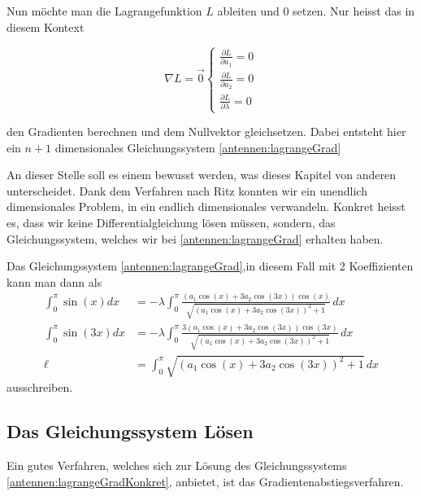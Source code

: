 Nun möchte man die Lagrangefunktion $L$ ableiten und 0 setzen. Nur heisst das in
diesem Kontext

\begin{equation}
	\nabla L = \vec{0} 
	\left\{ 
	\begin{aligned}
		\frac{\partial L}{\partial a_1} = 0 \\
		\frac{\partial L}{\partial a_2} = 0 \\
		\frac{\partial L}{\partial \lambda} = 0
	\end{aligned}
	\right.
	\label{antennen:lagrangeGrad}
\end{equation}

den Gradienten berechnen und dem Nullvektor gleichsetzen. Dabei entsteht hier ein 
$n+1$ dimensionales Gleichungssystem \eqref{antennen:lagrangeGrad}

An dieser Stelle soll es einem bewusst werden, was dieses Kapitel von anderen 
unterscheidet. Dank dem Verfahren nach Ritz konnten wir ein unendlich dimensionales
Problem, in ein endlich dimensionales verwandeln. 
Konkret heisst es, dass wir keine Differentialgleichung lösen müssen, sondern, 
das Gleichungssystem, welches wir bei \eqref{antennen:lagrangeGrad} erhalten haben.

Das Gleichungssystem \eqref{antennen:lagrangeGrad},in diesem Fall mit 
2 Koeffizienten kann man dann als
\begin{equation}
	\begin{aligned}
		\int_0^\pi \sin (x) dx
		&=
		-\lambda \int_0^\pi \frac{\left(a_1 \cos (x)+3 a_2 \cos (3 x)\right) 
			\cos (x)}{\sqrt{\left(a_1 \cos (x)+3 a_2 \cos (3 x)\right)^2+1}} \, dx \\
		\int_0^\pi \sin (3 x) dx
		&=
		-\lambda \int_0^\pi \frac{3\left(a_1 \cos (x)+3 a_2 \cos (3 x)\right) 
			\cos (3 x)}{\sqrt{\left(a_1 \cos (x)+3 a_2 \cos (3 x)\right)^2+1}} \, dx \\
		\ell
		&=
		\int_0^\pi \sqrt{\left(a_1 \cos (x)+3 a_2 \cos (3 x)\right)^2+1} \, dx
	\end{aligned}
	\label{antennen:lagrangeGradKonkret}
\end{equation}
ausschreiben. 

\subsection{Das Gleichungssystem Lösen\label{antennen:glSysSolve}}

Ein gutes Verfahren, welches sich zur Lösung des Gleichungssystems \eqref{antennen:lagrangeGradKonkret}, 
anbietet, ist das Gradientenabstiegsverfahren.

